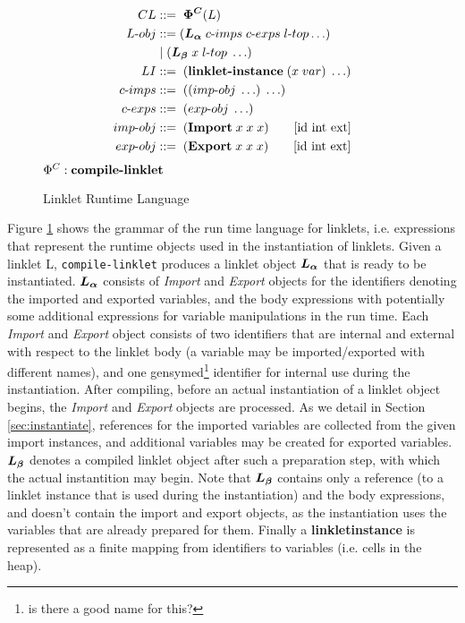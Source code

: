 \documentclass[sigplan,screen,anonymous]{acmart}
\def\dash {\text{-}}
\begin{document}
\begin{figure}[tbp]
  \begin{align*}
    CL             &::=\; \bm{\Phi^C}(L)\\
    L\dash obj     &::= (\la\; c\dash imps \; c\dash exps \; l\dash top \ldots)\\
    \;           &\;|\; (\lb\; x\; l\dash top\; \ldots) \\
    LI             &::=\; (\textbf{linklet\dash instance}\; (x\; var)\; \ldots) \\
    c\dash imps    &::=\; ((imp\dash obj\; \ldots)\; \ldots)\\
    c\dash exps    &::=\; (exp\dash obj\; \ldots)\\
    imp\dash obj   &::=\; (\textbf{Import}\; x\; x\; x) \tag*{[id int ext]} \\
    exp\dash obj   &::=\; (\textbf{Export}\; x\; x\; x) \tag*{[id int ext]} \\
  \end{align*}
  \hfill \footnotesize $\Phi^C : \textbf{compile\dash linklet}$
\caption{Linklet Runtime Language}
\label{fig:linklet-runtime}
\end{figure}

Figure \ref{fig:linklet-runtime} shows the grammar of the run\dash
time language for linklets, i.e. expressions that represent the
run\dash time objects used in the instantiation of linklets. Given a
linklet L, \verb|compile-linklet| produces a linklet object $\bm{L_\alpha}$ that
is ready to be instantiated. $\bm{L_\alpha}$ consists of \textit{Import} and
\textit{Export} objects for the identifiers denoting the imported and
exported variables, and the body expressions with potentially some
additional expressions for variable manipulations in the run\dash
time. Each \textit{Import} and \textit{Export} object consists of two
identifiers that are internal and external with respect to the linklet
body (a variable may be imported/exported with different names), and
one gensymed\footnote{is there a good name for this?} identifier for
internal use during the instantiation. After compiling, before an
actual instantiation of a linklet object begins, the \textit{Import}
and \textit{Export} objects are processed. As we detail in Section
\ref{sec:instantiate}, references for the imported variables are
collected from the given import instances, and additional variables
may be created for exported variables. $\bm{L_\beta}$ denotes a compiled
linklet object after such a preparation step, with which the actual
instantition may begin. Note that $\bm{L_\beta}$ contains only a reference (to
a linklet instance that is used during the instantiation) and the body
expressions, and doesn't contain the import and export objects, as the
instantiation uses the variables that are already prepared for
them. Finally a \textbf{linklet\dash instance} is represented as a
finite mapping from identifiers to variables (i.e. cells in the heap).
\end{document}
